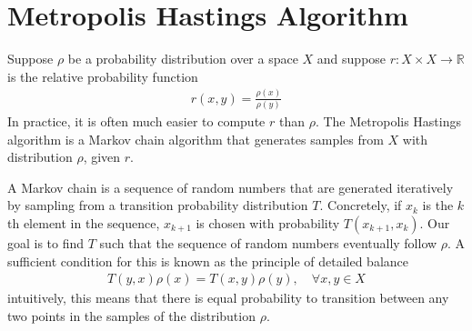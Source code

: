 \documentclass{article}
\begin{document}


\section{Metropolis Hastings Algorithm}

Suppose $\rho$ be a probability distribution over a space $X$
and suppose $r: X \times X \to \mathbb{R}$ is the relative probability function
\begin{align*}
    r(x, y) = \frac{\rho(x)}{\rho(y)}
\end{align*}
In practice, it is often much easier to compute $r$ than $\rho$.
The Metropolis Hastings algorithm is a Markov chain algorithm that generates samples from $X$ with distribution $\rho$, given $r$.

A Markov chain is a sequence of random numbers that are generated iteratively by sampling from a transition probability distribution $T$.
Concretely, if $x_k$ is the $k$th element in the sequence, $x_{k+1}$ is chosen with probability $T(x_{k + 1}, x_k)$. Our goal is to find $T$
such that the sequence of random numbers eventually follow $\rho$. A sufficient condition for this is known as the principle of detailed balance
\begin{align*}
    T(y, x) \rho(x) = T(x, y) \rho(y),\quad \forall x, y \in X
\end{align*}
intuitively, this means that there is equal probability to transition between any two points in the samples of the distribution $\rho$.
\end{document}

